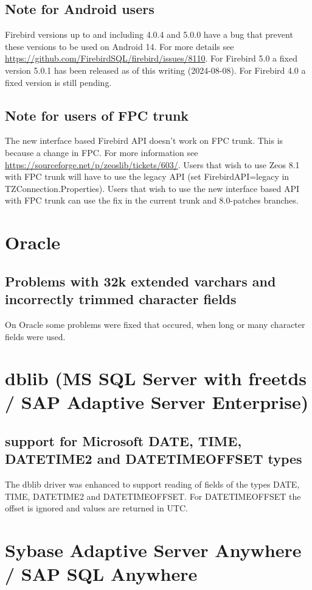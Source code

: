 \documentclass[a4paper,12pt,oneside]{report}
\begin{document}
\subsection{Note for Android users}
Firebird versions up to and including 4.0.4 and 5.0.0 have a bug that prevent these versions to be used on Android 14.
For more details see \url{https://github.com/FirebirdSQL/firebird/issues/8110}.
For Firebird 5.0 a fixed version 5.0.1 has been released as of this writing (2024-08-08).
For Firebird 4.0 a fixed version is still pending.

\subsection{Note for users of FPC trunk}
The new interface based Firebird API doesn't work on FPC trunk.
This is because a change in FPC.
For more information see \url{https://sourceforge.net/p/zeoslib/tickets/603/}.
Users that wish to use Zeos 8.1 with FPC trunk will have to use the legacy API (set FirebirdAPI=legacy in TZConnection.Properties).
Users that wish to use the new interface based API with FPC trunk can use the fix in the current trunk and 8.0-patches branches.

\section{Oracle}
\subsection{Problems with 32k extended varchars and incorrectly trimmed character fields}
On Oracle some problems were fixed that occured, when long or many character fields were used.

\section{dblib (MS SQL Server with freetds / SAP Adaptive Server Enterprise)}
\subsection{support for Microsoft DATE, TIME, DATETIME2 and DATETIMEOFFSET types}
The dblib driver was enhanced to support reading of fields of the types DATE, TIME, DATETIME2 and DATETIMEOFFSET.
For DATETIMEOFFSET the offset is ignored and values are returned in UTC.

\section{Sybase Adaptive Server Anywhere / SAP SQL Anywhere}
\end{document}
